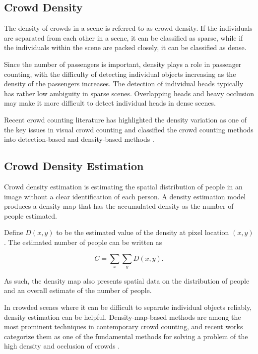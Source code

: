 \subsection{Crowd Density}

The density of crowds in a scene is referred to as crowd density. If the individuals are separated from each other in a scene, it can be classified as sparse, while if the individuals within the scene are packed closely, it can be classified as dense.

Since the number of passengers is important, density plays a role in passenger counting, with the difficulty of detecting individual objects increasing as the density of the passengers increases. The detection of individual heads typically has rather low ambiguity in sparse scenes. Overlapping heads and heavy occlusion may make it more difficult to detect individual heads in dense scenes.

Recent crowd counting literature has highlighted the density variation as one of the key issues in visual crowd counting and classified the crowd counting methods into detection-based and density-based methods \cite{fan2022survey,verma2023revisiting}.

\subsection{Crowd Density Estimation}

Crowd density estimation is estimating the spatial distribution of people in an image without a clear identification of each person. A density estimation model produces a density map that has the accumulated density as the number of people estimated.

Define $D(x,y)$ to be the estimated value of the density at pixel location $(x,y)$. The estimated number of people can be written as

\begin{equation}
C = \sum_{x}\sum_{y}D(x,y).
\end{equation}

As such, the density map also presents spatial data on the distribution of people and an overall estimate of the number of people.

In crowded scenes where it can be difficult to separate individual objects reliably, density estimation can be helpful. Density-map-based methods are among the most prominent techniques in contemporary crowd counting, and recent works categorize them as one of the fundamental methods for solving a problem of the high density and occlusion of crowds \cite{sindagi2022survey}.


